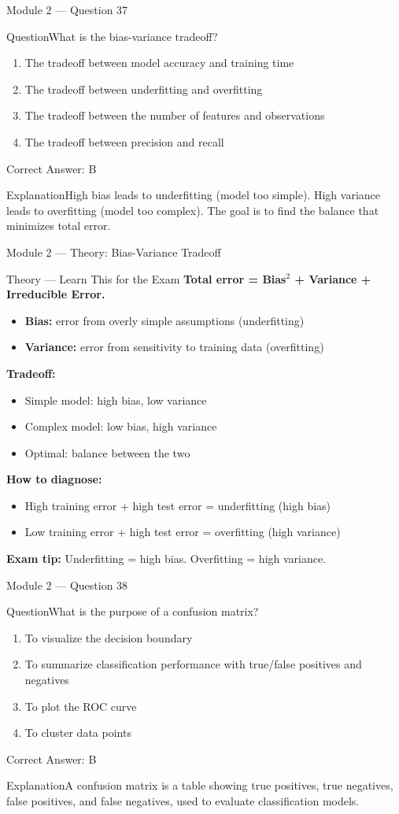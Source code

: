 \documentclass[aspectratio=169,10pt]{beamer}
\newcommand{\question}[1]{\begin{block}{Question}#1\end{block}}
\newcommand{\options}[4]{%
	\begin{enumerate}[label=\Alph*.,leftmargin=*]
		\item #1
		\item #2
		\item #3
		\item #4
	\end{enumerate}
}
\newcommand{\answerbox}[1]{\begin{exampleblock}{Correct Answer: #1}\end{exampleblock}}
\newcommand{\explain}[1]{\begin{block}{Explanation}#1\end{block}}
\newcommand{\theory}[1]{%
	\begin{block}{Theory --- Learn This for the Exam}
		\small #1
	\end{block}
}
\begin{document}
	\begin{frame}{Module 2 --- Question 37}
		\question{What is the bias-variance tradeoff?}
		\options{The tradeoff between model accuracy and training time}{The tradeoff between underfitting and overfitting}{The tradeoff between the number of features and observations}{The tradeoff between precision and recall}
		\answerbox{B}
		\explain{High bias leads to underfitting (model too simple). High variance leads to overfitting (model too complex). The goal is to find the balance that minimizes total error.}
	\end{frame}
	
	\begin{frame}{Module 2 --- Theory: Bias-Variance Tradeoff}
		\theory{
			\textbf{Total error = Bias$^2$ + Variance + Irreducible Error.}
			\begin{itemize}
				\item \textbf{Bias:} error from overly simple assumptions (underfitting)
				\item \textbf{Variance:} error from sensitivity to training data (overfitting)
			\end{itemize}
			\textbf{Tradeoff:}
			\begin{itemize}
				\item Simple model: high bias, low variance
				\item Complex model: low bias, high variance
				\item Optimal: balance between the two
			\end{itemize}
			\textbf{How to diagnose:}
			\begin{itemize}
				\item High training error + high test error = underfitting (high bias)
				\item Low training error + high test error = overfitting (high variance)
			\end{itemize}
			\textbf{Exam tip:} Underfitting = high bias. Overfitting = high variance.
		}
	\end{frame}
	
	\begin{frame}{Module 2 --- Question 38}
		\question{What is the purpose of a confusion matrix?}
		\options{To visualize the decision boundary}{To summarize classification performance with true/false positives and negatives}{To plot the ROC curve}{To cluster data points}
		\answerbox{B}
		\explain{A confusion matrix is a table showing true positives, true negatives, false positives, and false negatives, used to evaluate classification models.}
	\end{frame}
	
\end{document}
